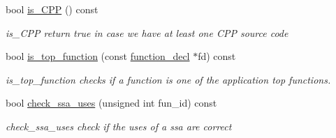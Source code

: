 \begin{DoxyCompactItemize}
bool \hyperlink{classtree__manager_aa773de2157d22f12e2b48a486dbc17aa}{is\+\_\+\+C\+PP} () const
\begin{DoxyCompactList}\small\item\em is\+\_\+\+C\+PP return true in case we have at least one C\+PP source code \end{DoxyCompactList}\item 
bool \hyperlink{classtree__manager_afc6bce0d4cba04bf033ad17f3fc9c5c1}{is\+\_\+top\+\_\+function} (const \hyperlink{structfunction__decl}{function\+\_\+decl} $\ast$fd) const
\begin{DoxyCompactList}\small\item\em is\+\_\+top\+\_\+function checks if a function is one of the application top functions. \end{DoxyCompactList}\item 
bool \hyperlink{classtree__manager_a6fae9da2246a0c0ea6fb1bdaeef7d54f}{check\+\_\+ssa\+\_\+uses} (unsigned int fun\+\_\+id) const
\begin{DoxyCompactList}\small\item\em check\+\_\+ssa\+\_\+uses check if the uses of a ssa are correct \end{DoxyCompactList}\end{DoxyCompactItemize}
